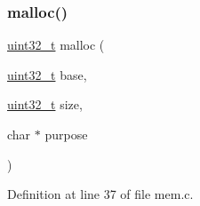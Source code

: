 \subsubsection{\texorpdfstring{malloc()}{malloc()}}
{\footnotesize\ttfamily \hyperlink{a00104_a435d1572bf3f880d55459d9805097f62_a435d1572bf3f880d55459d9805097f62}{uint32\+\_\+t} malloc (\begin{DoxyParamCaption}\item[{\hyperlink{a00104_a435d1572bf3f880d55459d9805097f62_a435d1572bf3f880d55459d9805097f62}{uint32\+\_\+t}}]{base,  }\item[{\hyperlink{a00104_a435d1572bf3f880d55459d9805097f62_a435d1572bf3f880d55459d9805097f62}{uint32\+\_\+t}}]{size,  }\item[{char $\ast$}]{purpose }\end{DoxyParamCaption})}



Definition at line 37 of file mem.\+c.


